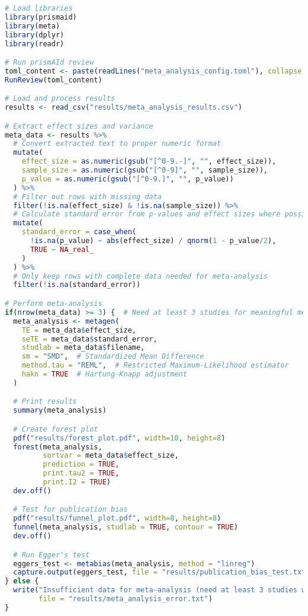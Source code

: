 \begin{commandbox}
\begin{lstlisting}[language=R]
# Load libraries
library(prismaid)
library(meta)
library(dplyr)
library(readr)

# Run prismAId review
toml_content <- paste(readLines("meta_analysis_config.toml"), collapse = "\n")
RunReview(toml_content)

# Load and process results
results <- read_csv("results/meta_analysis_results.csv")

# Extract effect sizes and variance
meta_data <- results %>%
  # Convert extracted text to proper numeric format
  mutate(
    effect_size = as.numeric(gsub("[^0-9.-]", "", effect_size)),
    sample_size = as.numeric(gsub("[^0-9]", "", sample_size)),
    p_value = as.numeric(gsub("[^0-9.]", "", p_value))
  ) %>%
  # Filter out rows with missing data
  filter(!is.na(effect_size) & !is.na(sample_size)) %>%
  # Calculate standard error from p-values and effect sizes where possible
  mutate(
    standard_error = case_when(
      !is.na(p_value) ~ abs(effect_size) / qnorm(1 - p_value/2),
      TRUE ~ NA_real_
    )
  ) %>%
  # Only keep rows with complete data needed for meta-analysis
  filter(!is.na(standard_error))

# Perform meta-analysis
if(nrow(meta_data) >= 3) {  # Need at least 3 studies for meaningful meta-analysis
  meta_analysis <- metagen(
    TE = meta_data$effect_size,
    seTE = meta_data$standard_error,
    studlab = meta_data$filename,
    sm = "SMD",  # Standardized Mean Difference
    method.tau = "REML",  # Restricted Maximum-Likelihood estimator
    hakn = TRUE  # Hartung-Knapp adjustment
  )

  # Print results
  summary(meta_analysis)

  # Create forest plot
  pdf("results/forest_plot.pdf", width=10, height=8)
  forest(meta_analysis,
         sortvar = meta_data$effect_size,
         prediction = TRUE,
         print.tau2 = TRUE,
         print.I2 = TRUE)
  dev.off()

  # Test for publication bias
  pdf("results/funnel_plot.pdf", width=8, height=8)
  funnel(meta_analysis, studlab = TRUE, contour = TRUE)
  dev.off()

  # Run Egger's test
  eggers_test <- metabias(meta_analysis, method = "linreg")
  capture.output(eggers_test, file = "results/publication_bias_test.txt")
} else {
  write("Insufficient data for meta-analysis (need at least 3 studies with effect sizes and standard errors)",
        file = "results/meta_analysis_error.txt")
}
\end{lstlisting}
\end{commandbox}

